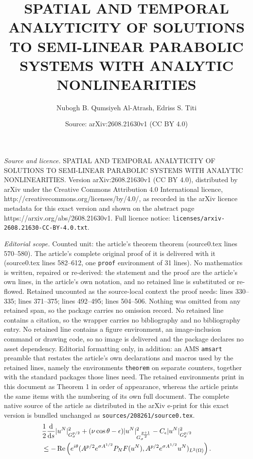 \documentclass[10pt,a4paper]{amsart}
\title{\textbf \large {SPATIAL AND TEMPORAL ANALYTICITY OF SOLUTIONS TO SEMI-LINEAR PARABOLIC SYSTEMS WITH ANALYTIC NONLINEARITIES}}
\author{Nubogh B. Qumsiyeh Al-Atrash, Edriss S. Titi}
\date{Source: arXiv:2608.21630v1 (CC BY 4.0)}
\newcommand{\dd}{\mathrm{d}}
\begin{document}
\maketitle

\noindent\emph{Source and licence.} \textbf \large {SPATIAL AND TEMPORAL ANALYTICITY OF SOLUTIONS TO SEMI-LINEAR PARABOLIC SYSTEMS WITH ANALYTIC NONLINEARITIES}. Version arXiv:2608.21630v1 (CC BY 4.0), distributed by arXiv under the Creative Commons Attribution 4.0 International licence, http://creativecommons.org/licenses/by/4.0/, as recorded in the arXiv licence metadata for this exact version and shown on the abstract page https://arxiv.org/abs/2608.21630v1. Full licence notice: \texttt{licenses/arxiv-2608.21630-CC-BY-4.0.txt}.\par\smallskip

\noindent\textit{Editorial scope.} Counted unit: the article's theorem theorem (source0.tex lines 570--580). The article's complete original proof of it is delivered with it (source0.tex lines 582--612, one \texttt{proof} environment of 31 lines). No mathematics is written, repaired or re-derived: the statement and the proof are the article's own lines, in the article's own notation, and no retained line is substituted or re-flowed.  Retained uncounted as the source-local context the proof needs: lines 330--335; lines 371--375; lines 492--495; lines 504--506.  Nothing was omitted from any retained span, so the package carries no omission record.  No retained line contains a citation, so the wrapper carries no bibliography and no bibliography entry.  No retained line contains a figure environment, an image-inclusion command or drawing code, so no image is delivered and the package declares no asset dependency.  Editorial formatting only, in addition: an AMS \texttt{amsart} preamble that restates the article's own declarations and macros used by the retained lines, namely the environments \texttt{theorem} on separate counters, together with the standard packages those lines need.  The retained environments print in this document as Theorem 1 in order of appearance, whereas the article prints the same items with the numbering of its own full document.  The complete native source of the article as distributed in the arXiv e-print for this exact version is bundled unchanged as \texttt{sources/208261/source0.tex}.
\begin{align}
& \frac{1}{2} \frac{\dd}{\dd s} |u^N|_{G_\sigma^{p/2}}^2 + (\nu \cos\theta -\epsilon)|u^N|_{G_\sigma^{\frac{p+1}{2}}}^2 -C_{\epsilon}|u^N|_{
G_\sigma^{p/2}
}^2 \notag \\
&\leq -\operatorname{Re}\left( e^{i\theta}( A^{p/2} e^{\sigma A^{1/2}} P_N F(u^N), A^{p/2} e^{\sigma A^{1/2}} u^N)_ {L^2(\Omega)}\right).\label{11}
\end{align}
\end{document}
